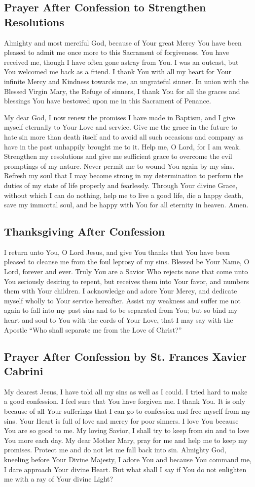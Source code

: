 \documentclass[12pt]{article}
\newcommand{\prayertitle}[1]{\subsection{#1}}
\begin{document}
\prayertitle{Prayer After Confession to Strengthen Resolutions}
Almighty and most merciful God, because of Your great Mercy You have been pleased to admit me once more to this Sacrament of forgiveness.
You have received me, though I have often gone astray from You.
I was an outcast, but You welcomed me back as a friend.
I thank You with all my heart for Your infinite Mercy and Kindness towards me, an ungrateful sinner.
In union with the Blessed Virgin Mary, the Refuge of sinners, I thank You for all the graces and blessings You have bestowed upon me in this Sacrament of Penance.

My dear God, I now renew the promises I have made in Baptism, and I give myself eternally to Your Love and service.
Give me the grace in the future to hate sin more than death itself and to avoid all such occasions and company as have in the past unhappily brought me to it.
Help me, O Lord, for I am weak.
Strengthen my resolutions and give me sufficient grace to overcome the evil promptings of my nature.
Never permit me to wound You again by my sins.
Refresh my soul that I may become strong in my determination to perform the duties of my state of life properly and fearlessly.
Through Your divine Grace, without which I can do nothing, help me to live a good life, die a happy death, save my immortal soul, and be happy with You for all eternity in heaven. Amen.

\prayertitle{Thanksgiving After Confession}
I return unto You, O Lord Jesus, and give You thanks that You have been pleased to cleanse me from the foul leprosy of my sins.
Blessed be Your Name, O Lord, forever and ever.
Truly You are a Savior Who rejects none that come unto You seriously desiring to repent, but receives them into Your favor, and numbers them with Your children.
I acknowledge and adore Your Mercy, and dedicate myself wholly to Your service hereafter.
Assist my weakness and suffer me not again to fall into my past sins and to be separated from You;
but so bind my heart and soul to You with the cords of Your Love, that I may say with the Apostle ``Who shall separate me from the Love of Christ?''

\prayertitle{Prayer After Confession by St. Frances Xavier Cabrini}
My dearest Jesus, I have told all my sins as well as I could.
I tried hard to make a good confession.
I feel sure that You have forgiven me.
I thank You.
It is only because of all Your sufferings that I can go to confession and free myself from my sins.
Your Heart is full of love and mercy for poor sinners.
I love You because You are so good to me.
My loving Savior, I shall try to keep from sin and to love You more each day.
My dear Mother Mary, pray for me and help me to keep my promises.
Protect me and do not let me fall back into sin.
Almighty God, kneeling before Your Divine Majesty, I adore You and because You command me, I dare approach Your divine Heart.
But what shall I say if You do not enlighten me with a ray of Your divine Light?
\end{document}
